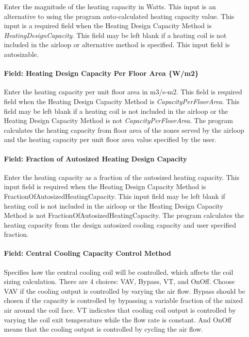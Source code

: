Enter the magnitude of the heating capacity in Watts. This input is an alternative to using the program auto-calculated heating capacity value. This input is a required field when the Heating Design Capacity Method is \emph{HeatingDesignCapacity}. This field may be left blank if a heating coil is not included in the airloop or alternative method is specified. This input field is autosizable.

\paragraph{Field: Heating Design Capacity Per Floor Area \{W/m2\}}\label{field-heating-design-capacity-per-floor-area-wm2-1}

Enter the heating capacity per unit floor area in m3/s-m2. This field is required field when the Heating Design Capacity Method is \emph{CapacityPerFloorArea}. This field may be left blank if a heating coil is not included in the airloop or the Heating Design Capacity Method is not \emph{CapacityPerFloorArea}. The program calculates the heating capacity from floor area of the zones served by the airloop and the heating capacity per unit floor area value specified by the user.

\paragraph{Field: Fraction of Autosized Heating Design Capacity}\label{field-fraction-of-autosized-heating-design-capacity-1}

Enter the heating capacity as a fraction of the autosized heating capacity. This input field is required when the Heating Design Capacity Method is FractionOfAutosizedHeatingCapacity. This input field may be left blank if heating coil is not included in the airloop or the Heating Design Capacity Method is not FractionOfAutosizedHeatingCapacity. The program calculates the heating capacity from the design autosized cooling capacity and user specified fraction.

\paragraph{Field: Central Cooling Capacity Control Method}\label{field-central-cooling-capacity-control-method}

Specifies how the central cooling coil will be controlled, which affects the coil sizing calculation. There are 4 choices: VAV, Bypass, VT, and OnOff. Choose VAV if the cooling output is controlled by varying the air flow. Bypass should be chosen if the capacity is controlled by bypassing a variable fraction of the mixed air around the coil face. VT indicates that cooling coil output is controlled by varying the coil exit temperature while the flow rate is constant. And OnOff means that the cooling output is controlled by cycling the air flow.


